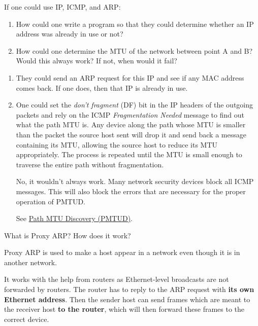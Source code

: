 \documentclass[12pt, oneside]{book}
\begin{document}
\begin{Exercise}
If one could use IP, ICMP, and ARP:
\begin{enumerate}
    \item How could one write a program so that they could determine whether an IP address was already in use or not?
    \item How could one determine the MTU of the network between point A and B?
    Would this always work? If not, when would it fail?
\end{enumerate}
\end{Exercise}
\begin{Answer}
\begin{enumerate}
    \item They could send an ARP request for this IP and see if any MAC address comes back.
    If one does, then that IP is already in use.
    \item One could set the \textit{don't fragment} (DF) bit in the IP headers of the outgoing packets and rely on the ICMP \textit{Fragmentation Needed} message to find out what the path MTU is. Any device along the path whose MTU is smaller than the packet the source host sent will drop it and send back a message containing its MTU, allowing the source host to reduce its MTU appropriately. The process is repeated until the MTU is small enough to traverse the entire path without fragmentation.

    No, it wouldn't always work. Many network security devices block all ICMP messages. This will also block the errors that are necessary for the proper operation of PMTUD.

    See \href{https://en.wikipedia.org/wiki/Path_MTU_Discovery}{Path MTU Discovery (PMTUD)}.
\end{enumerate}
\end{Answer}

\begin{Exercise}
What is Proxy ARP? How does it work?
\end{Exercise}
\begin{Answer}
Proxy ARP is used to make a host appear in a network even though it is in another network.

It works with the help from routers as Ethernet-level broadcasts are not forwarded by routers.
The router has to reply to the ARP request with \textbf{its own Ethernet address}.
Then the sender host can send frames which are meant to the receiver host \textbf{to the router}, which will then forward these frames to the correct device.
\end{Answer}
\end{document}
